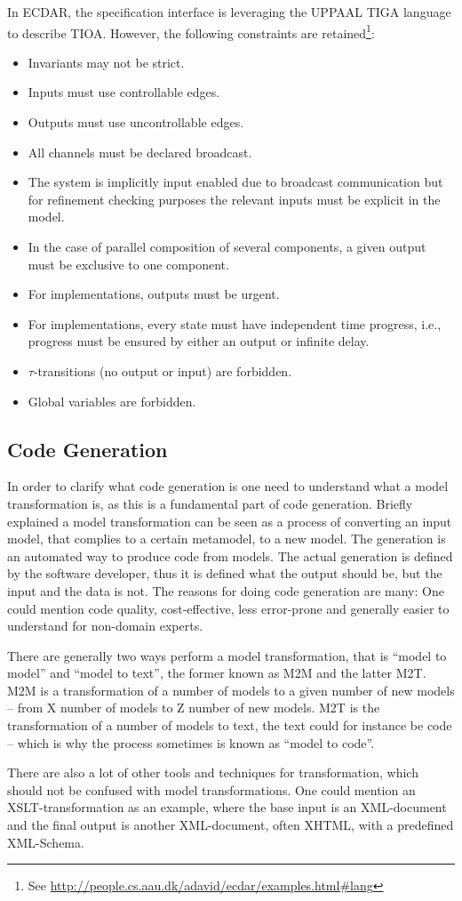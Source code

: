 In ECDAR, the specification interface is leveraging the UPPAAL TIGA language
\cite{behrmann_uppaal-tiga:_2006} to describe TIOA. However, the following
constraints are retained\footnote{See
  \url{http://people.cs.aau.dk/adavid/ecdar/examples.html#lang}}:


\begin{itemize}
\item Invariants may not be strict.
\item Inputs must use controllable edges.
\item Outputs must use uncontrollable edges.
\item All channels must be declared broadcast.
\item The system is implicitly input enabled due to broadcast communication but
  for refinement checking purposes the relevant inputs must be explicit in the
  model.
\item In the case of parallel composition of several components, a given output
  must be exclusive to one component.
\item For implementations, outputs must be urgent.
\item For implementations, every state must have independent time progress,
  i.e., progress must be ensured by either an output or infinite delay.
\item $\tau$-transitions (no output or input) are forbidden.
\item Global variables are forbidden.
\end{itemize}

\subsection{Code Generation}
\label{background-codegeneration}

In order to clarify what code generation is one need to understand what a model
transformation is, as this is a fundamental part of code generation. Briefly explained a model transformation can be seen as a process of converting an input model, that complies to a certain metamodel, to a new model. The generation is an automated way to produce code from models. The actual generation is defined by the software developer, thus it is defined what the output should be, but the input and the data is not. The reasons for doing code generation are many: One could mention code quality, cost-effective, less error-prone and generally easier to understand for non-domain experts.

There are generally two ways perform a model transformation, that is ``model to model'' and ``model to text'', the former known as M2M and the latter M2T. M2M is a transformation of a number of models to a given number of new models -- from X number of models to Z number of new models. M2T is  the transformation of a number of models to text, the text could for instance be code -- which is why the process sometimes is known as ``model to code''.

There are also a lot of other tools and techniques for transformation, which should not be confused with model transformations. One could mention an XSLT-transformation as an example, where the base input is an XML-document and the final output is
another XML-document, often XHTML, with a predefined XML-Schema.

